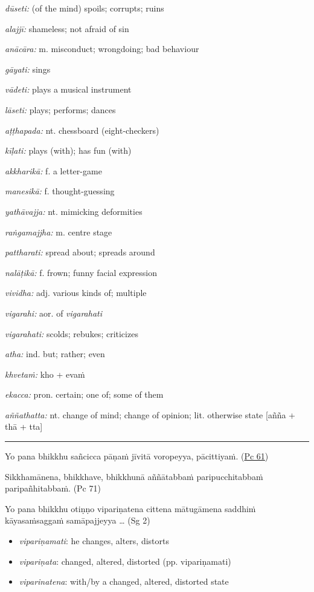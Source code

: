 \documentclass[11pt,oneside]{memoir}
\begin{document}
\begin{widecols}
\columnbreak

\emph{dūseti:} (of the mind) spoils; corrupts; ruins

\emph{alajjī:} shameless; not afraid of sin

\emph{anācāra:} m. misconduct; wrongdoing; bad behaviour

\emph{gāyati:} sings

\emph{vādeti:} plays a musical instrument

\emph{lāseti:} plays; performs; dances

\emph{aṭṭhapada:} nt. chessboard (eight-checkers)

\emph{kīḷati:} plays (with); has fun (with)

\emph{akkharikā:} f. a letter-game

\emph{manesikā:} f. thought-guessing

\emph{yathāvajja:} nt. mimicking deformities

\emph{raṅgamajjha:} m. centre stage

\emph{pattharati:} spread about; spreads around

\emph{nalāṭikā:} f. frown; funny facial expression

\emph{vividha:} adj. various kinds of; multiple

\emph{vigarahi:} aor. of \emph{vigarahati}

\emph{vigarahati:} scolds; rebukes; criticizes

\emph{atha:} ind. but; rather; even

\emph{khvetaṁ:} kho + evaṁ

\emph{ekacca:} pron. certain; one of; some of them

\emph{aññathatta:} nt. change of mind; change of opinion; lit. otherwise state [añña + thā + tta]
\end{widecols}

\noindent\rule{\textwidth}{0.5pt}

Yo pana bhikkhu sañcicca pāṇaṁ jīvitā voropeyya, pācittiyaṁ. (\href{https://suttacentral.net/pli-tv-bu-vb-pc61/pli/ms}{Pc 61})

Sikkhamānena, bhikkhave, bhikkhunā aññātabbaṁ paripucchitabbaṁ paripañhitabbaṁ. (Pc 71)

Yo pana bhikkhu otiṇṇo vipariṇatena cittena mātugāmena saddhiṁ kāyasaṁsaggaṁ samāpajjeyya \ldots{} (Sg 2)

\begin{itemize}
\item \emph{vipariṇamati}: he changes, alters, distorts
\item \emph{vipariṇata}: changed, altered, distorted (pp. vipariṇamati)
\item \emph{viparinatena}: with/by a changed, altered, distorted state
\end{itemize}
\end{document}
